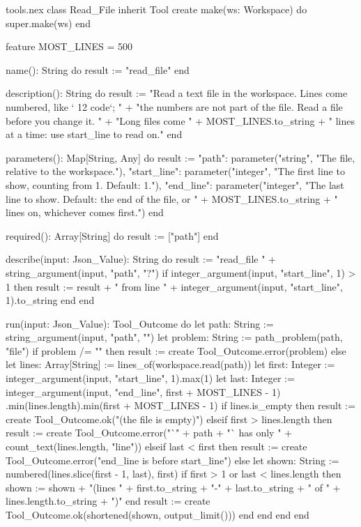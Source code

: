 \begin{append}{tools.nex}
class Read_File inherit Tool
create
  make(ws: Workspace) do
    super.make(ws)
  end

feature
  MOST_LINES = 500

  name(): String do
    result := "read_file"
  end

  description(): String do
    result := "Read a text file in the workspace. Lines come numbered, like `   12  code`; "
      + "the numbers are not part of the file. Read a file before you change it. "
      + "Long files come " + MOST_LINES.to_string + " lines at a time: use start_line to read on."
  end

  parameters(): Map[String, Any] do
    result := {"path": parameter("string", "The file, relative to the workspace."),
      "start_line": parameter("integer", "The first line to show, counting from 1. Default: 1."),
      "end_line": parameter("integer", "The last line to show. Default: the end of the file, or "
        + MOST_LINES.to_string + " lines on, whichever comes first.")}
  end

  required(): Array[String] do
    result := ["path"]
  end

  describe(input: Json_Value): String do
    result := "read_file " + string_argument(input, "path", "?")
    if integer_argument(input, "start_line", 1) > 1 then
      result := result + " from line " + integer_argument(input, "start_line", 1).to_string
    end
  end

  run(input: Json_Value): Tool_Outcome do
    let path: String := string_argument(input, "path", "")
    let problem: String := path_problem(path, "file")
    if problem /= "" then
      result := create Tool_Outcome.error(problem)
    else
      let lines: Array[String] := lines_of(workspace.read(path))
      let first: Integer := integer_argument(input, "start_line", 1).max(1)
      let last: Integer := integer_argument(input, "end_line", first + MOST_LINES - 1)
        .min(lines.length).min(first + MOST_LINES - 1)
      if lines.is_empty then
        result := create Tool_Outcome.ok("(the file is empty)")
      elseif first > lines.length then
        result := create Tool_Outcome.error("`" + path + "` has only "
          + count_text(lines.length, "line"))
      elseif last < first then
        result := create Tool_Outcome.error("end_line is before start_line")
      else
        let shown: String := numbered(lines.slice(first - 1, last), first)
        if first > 1 or last < lines.length then
          shown := shown + "(lines " + first.to_string + "-" + last.to_string
            + " of " + lines.length.to_string + ")\n"
        end
        result := create Tool_Outcome.ok(shortened(shown, output_limit()))
      end
    end
  end
end
\end{append}

